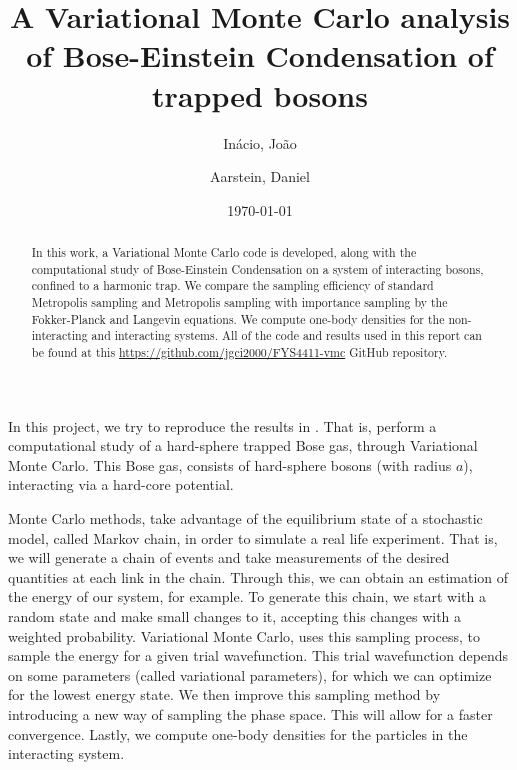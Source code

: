 \documentclass[aps,reprint,superscriptaddress,nofootinbib]{revtex4-2}
\begin{document}
\title{A Variational Monte Carlo analysis of Bose-Einstein Condensation of trapped bosons}

\author{Inácio, João}
\author{Aarstein, Daniel}

\date{\today}

\begin{abstract}
    In this work, a Variational Monte Carlo code is developed, along with the computational study of Bose-Einstein Condensation on a system of interacting bosons, confined to a harmonic trap. We compare the sampling efficiency of standard Metropolis sampling and Metropolis sampling with importance sampling by the Fokker-Planck and Langevin equations. We compute one-body densities for the non-interacting and interacting systems. All of the code and results used in this report can be found at this \url{https://github.com/jgci2000/FYS4411-vmc} GitHub repository.
\end{abstract}

\maketitle

    In this project, we try to reproduce the results in \cite{bec-trapped-bosons}. That is, perform a computational study of a hard-sphere trapped Bose gas, through Variational Monte Carlo. This Bose gas, consists of hard-sphere bosons (with radius \(a\)), interacting via a hard-core potential. 
    
    Monte Carlo methods, take advantage of the equilibrium state of a stochastic model, called Markov chain, in order to simulate a real life experiment. That is, we will generate a chain of events and take measurements of the desired quantities at each link in the chain. Through this, we can obtain an estimation of the energy of our system, for example. To generate this chain, we start with a random state and make small changes to it, accepting this changes with a weighted probability. Variational Monte Carlo, uses this sampling process, to sample the energy for a given trial wavefunction. This trial wavefunction depends on some parameters (called variational parameters), for which we can optimize for the lowest energy state. We then improve this sampling method by introducing a new way of sampling the phase space. This will allow for a faster convergence. Lastly, we compute one-body densities for the particles in the interacting system.
\end{document}
